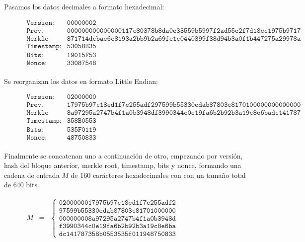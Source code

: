 \documentclass{article}
\begin{document}
    Pasamos los datos decimales a formato hexadecimal:
    \begin{figure}[H]
    \centering
    \scriptsize{
        $\begin{array}{ll}
            \texttt{Version:} & \texttt{00000002} \\
            \texttt{Prev. Block:} & \texttt{000000000000000117c80378b8da0e33559b5997f2ad55e2f7d18ec1975b9717} \\
            \texttt{Merkle root:} & \texttt{871714dcbae6c8193a2bb9b2a69fe1c0440399f38d94b3a0f1b447275a29978a} \\
            \texttt{Timestamp:} & \texttt{53058B35} \\
            \texttt{Bits:} & \texttt{19015F53} \\
            \texttt{Nonce:} & \texttt{33087548} \\
        \end{array}$
    }
    \end{figure}
    
    Se reorganizan los datos en formato Little Endian:
    \begin{figure}[H]
    \centering
    \scriptsize{
        $\begin{array}{ll}
            \texttt{Version:} & \texttt{02000000} \\
            \texttt{Prev. Block:} & \texttt{17975b97c18ed1f7e255adf297599b55330edab87803c8170100000000000000} \\
            \texttt{Merkle root:} & \texttt{8a97295a2747b4f1a0b3948df3990344c0e19fa6b2b92b3a19c8e6badc141787} \\
            \texttt{Timestamp:} & \texttt{358B0553} \\
            \texttt{Bits:} & \texttt{535F0119} \\
            \texttt{Nonce:} & \texttt{48750833} \\
        \end{array}$
    }
    \end{figure}
    
    Finalmente se concatenan uno a continuación de otro, empezando por versión, hash del bloque anterior, merkle root, timestamp, bits y nonce, formando una cadena de entrada $M$ de 160 carácteres hexadecimales con con un tamaño total de 640 bits.
    
    \begin{figure}[H]
    \centering
        $\begin{array}{rcl}
             M & = & \left \{
            \begin{array}{c}
                \texttt{0200000017975b97c18ed1f7e255adf2} \\
                \texttt{97599b55330edab87803c81701000000} \\
                \texttt{000000008a97295a2747b4f1a0b3948d} \\
                \texttt{f3990344c0e19fa6b2b92b3a19c8e6ba} \\
                \texttt{dc141787358b0553535f011948750833}
            \end{array}
            \right .
        \end{array}$
    \end{figure}
    
\end{document}
